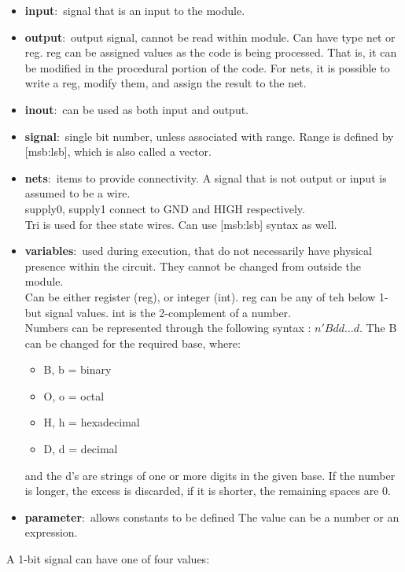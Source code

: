 \documentclass[nobib]{tufte-handout}
\newcommand{\defn}[2]{\noindent\textbf{#1}:\ #2}
\begin{document}
    \begin{itemize}
        \item \defn{input}{signal that is an input to the module.}
        \item \defn{output}{output signal, cannot be read within module.} Can have type net or reg. reg can be assigned values as the code is being processed. That is, it can be modified in the procedural portion of the code. For nets, it is possible to write a reg, modify them, and assign the result to the net.
        \item \defn{inout}{can be used as both input and output.}
        \item \defn{signal}{single bit number, unless associated with range. Range is defined by [msb:lsb], which is also called a vector.}
        \item \defn{nets}{items to provide connectivity. A signal that is not output or input is assumed to be a wire.}\\ supply0, supply1 connect to GND and HIGH respectively.\\ Tri is used for thee state wires. Can use [msb:lsb] syntax as well.
        \item \defn{variables}{used during execution, that do not necessarily have physical presence within the circuit. They cannot be changed from outside the module.}\\Can be either register (reg), or integer (int). reg can be any of teh below 1-but signal values. int is the 2-complement of a number.\\ Numbers can be represented through the following syntax : $n'Bdd\ldots d$. The B can be changed for the required base, where:
              \begin{itemize}
                  \item B, b = binary
                  \item O, o = octal
                  \item H, h = hexadecimal
                  \item D, d = decimal
              \end{itemize}
              and the d's are strings of one or more digits in the given base. If the number is longer, the excess is discarded, if it is shorter, the remaining spaces are 0.
        \item \defn{parameter}{allows constants to be defined} The value can be a number or an expression.
    \end{itemize}
    A 1-bit signal can have one of four values:
\end{document}
